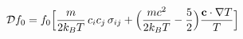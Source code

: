 \documentclass[preview]{standalone}
\begin{document}
\begin{align*}
\special{dvisvgm:raw <g id='unique000'>}\mathcal Df_0=f_0\Big[\frac{m}{2k_BT}\,c_ic_j\,\sigma_{ij}+\Big(\frac{mc^2}{2k_BT}-\frac52\Big)\frac{\va c\cdot\nabla T}{T}\Big]\special{dvisvgm:raw </g>}
\end{align*}
\end{document}
